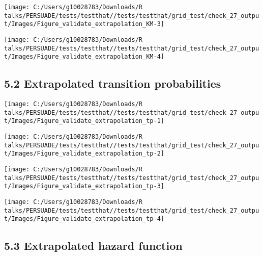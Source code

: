 \documentclass[
]{article}
\begin{document}
\begin{flushleft}\texttt{[image: C:/Users/g10028783/Downloads/R talks/PERSUADE/tests/testthat//tests/testthat/grid\_test/check\_27\_output/Images/Figure\_validate\_extrapolation\_KM-3]} \end{flushleft}

\begin{flushleft}\texttt{[image: C:/Users/g10028783/Downloads/R talks/PERSUADE/tests/testthat//tests/testthat/grid\_test/check\_27\_output/Images/Figure\_validate\_extrapolation\_KM-4]} \end{flushleft}

\clearpage

\subsection{5.2 Extrapolated transition
probabilities}\label{extrapolated-transition-probabilities}

\begin{flushleft}\texttt{[image: C:/Users/g10028783/Downloads/R talks/PERSUADE/tests/testthat//tests/testthat/grid\_test/check\_27\_output/Images/Figure\_validate\_extrapolation\_tp-1]} \end{flushleft}

\begin{flushleft}\texttt{[image: C:/Users/g10028783/Downloads/R talks/PERSUADE/tests/testthat//tests/testthat/grid\_test/check\_27\_output/Images/Figure\_validate\_extrapolation\_tp-2]} \end{flushleft}

\begin{flushleft}\texttt{[image: C:/Users/g10028783/Downloads/R talks/PERSUADE/tests/testthat//tests/testthat/grid\_test/check\_27\_output/Images/Figure\_validate\_extrapolation\_tp-3]} \end{flushleft}

\begin{flushleft}\texttt{[image: C:/Users/g10028783/Downloads/R talks/PERSUADE/tests/testthat//tests/testthat/grid\_test/check\_27\_output/Images/Figure\_validate\_extrapolation\_tp-4]} \end{flushleft}

\clearpage

\subsection{5.3 Extrapolated hazard
function}\label{extrapolated-hazard-function}
\end{document}

